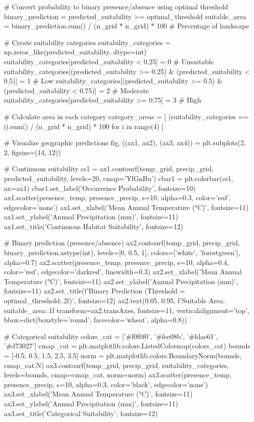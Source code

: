 \documentclass[11pt,a4paper]{article}
\begin{document}
\begin{pycode}
# Convert probability to binary presence/absence using optimal threshold
binary_prediction = predicted_suitability >= optimal_threshold
suitable_area = binary_prediction.sum() / (n_grid * n_grid) * 100  # Percentage of landscape

# Create suitability categories
suitability_categories = np.zeros_like(predicted_suitability, dtype=int)
suitability_categories[predicted_suitability < 0.25] = 0  # Unsuitable
suitability_categories[(predicted_suitability >= 0.25) & (predicted_suitability < 0.5)] = 1  # Low
suitability_categories[(predicted_suitability >= 0.5) & (predicted_suitability < 0.75)] = 2  # Moderate
suitability_categories[predicted_suitability >= 0.75] = 3  # High

# Calculate area in each category
category_areas = [
    (suitability_categories == i).sum() / (n_grid * n_grid) * 100
    for i in range(4)
]

# Visualize geographic predictions
fig, ((ax1, ax2), (ax3, ax4)) = plt.subplots(2, 2, figsize=(14, 12))

# Continuous suitability
cs1 = ax1.contourf(temp_grid, precip_grid, predicted_suitability,
                  levels=20, cmap='YlGnBu')
cbar1 = plt.colorbar(cs1, ax=ax1)
cbar1.set_label('Occurrence Probability', fontsize=10)
ax1.scatter(presence_temp, presence_precip, s=10, alpha=0.3,
           color='red', edgecolor='none')
ax1.set_xlabel('Mean Annual Temperature (°C)', fontsize=11)
ax1.set_ylabel('Annual Precipitation (mm)', fontsize=11)
ax1.set_title('Continuous Habitat Suitability', fontsize=12)

# Binary prediction (presence/absence)
ax2.contourf(temp_grid, precip_grid, binary_prediction.astype(int),
            levels=[0, 0.5, 1], colors=['white', 'forestgreen'], alpha=0.7)
ax2.scatter(presence_temp, presence_precip, s=10, alpha=0.4,
           color='red', edgecolor='darkred', linewidth=0.3)
ax2.set_xlabel('Mean Annual Temperature (°C)', fontsize=11)
ax2.set_ylabel('Annual Precipitation (mm)', fontsize=11)
ax2.set_title(f'Binary Prediction (Threshold = {optimal_threshold:.2f})', fontsize=12)
ax2.text(0.05, 0.95, f'Suitable Area: {suitable_area:.1f}%
        transform=ax2.transAxes, fontsize=11,
        verticalalignment='top',
        bbox=dict(boxstyle='round', facecolor='wheat', alpha=0.8))

# Categorical suitability
colors_cat = ['#f0f0f0', '#fee08b', '#fdae61', '#d73027']
cmap_cat = plt.matplotlib.colors.ListedColormap(colors_cat)
bounds = [-0.5, 0.5, 1.5, 2.5, 3.5]
norm = plt.matplotlib.colors.BoundaryNorm(bounds, cmap_cat.N)
ax3.contourf(temp_grid, precip_grid, suitability_categories,
            levels=bounds, cmap=cmap_cat, norm=norm)
ax3.scatter(presence_temp, presence_precip, s=10, alpha=0.3,
           color='black', edgecolor='none')
ax3.set_xlabel('Mean Annual Temperature (°C)', fontsize=11)
ax3.set_ylabel('Annual Precipitation (mm)', fontsize=11)
ax3.set_title('Categorical Suitability', fontsize=12)


\end{pycode}
\end{document}
